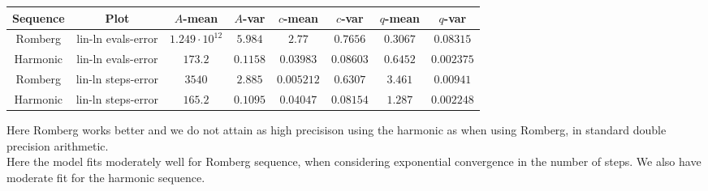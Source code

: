 \begin{table}[H]
    \centering
    \small
     \begin{tabular}{c|c||c|c|c|c|c|c}
Sequence & Plot & \(A\)-mean & \(A\)-var & \(c\)-mean & \(c\)-var & \(q\)-mean & \(q\)-var\\\hline
\rowcolor{red}
Romberg & lin-ln evals-error & \(1.249\cdot 10^{12}\) & \(5.984\) & \(2.77\) & \(0.7656\) & \(0.3067\) & \(0.08315\) \\
\rowcolor{green}
Harmonic & lin-ln evals-error & \(173.2\) & \(0.1158\) & \(0.03983\) & \(0.08603\) & \(0.6452\) & \(0.002375\) \\
\rowcolor{green}
Romberg & lin-ln steps-error & \(3540\) & \(2.885\) & \(0.005212\) & \(0.6307\) & \(3.461\) & \(0.00941\) \\
\rowcolor{green}
Harmonic & lin-ln steps-error & \(165.2\) & \(0.1095\) & \(0.04047\) & \(0.08154\) & \(1.287\) & \(0.002248\) \\
    \end{tabular}
    \label{tab:my_label}
\end{table}

Here Romberg works better and we do not attain as high precisison using the harmonic as when using Romberg, in standard double precision arithmetic.\\

Here the model fits moderately well for Romberg sequence, when considering exponential convergence in the number of steps. We also have moderate fit for the harmonic sequence.

